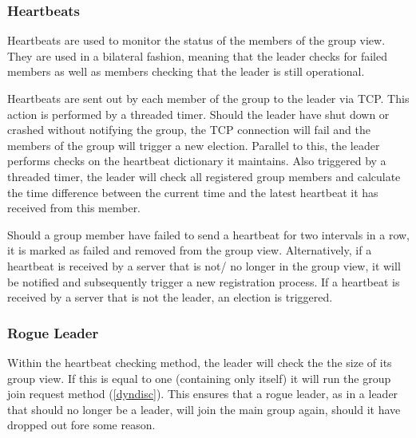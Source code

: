 \documentclass[runningheads]{llncs}
\begin{document}
\subsubsection{Heartbeats} \label{heartbeats}
Heartbeats are used to monitor the status of the members of the group view. They are used in a bilateral fashion, meaning that the leader checks for failed members as well as members checking that the leader is still operational.

Heartbeats are sent out by each member of the group to the leader via TCP. This action is performed by a threaded timer. Should the leader have shut down or crashed without notifying the group, the TCP connection will fail and the members of the group will trigger a new election. Parallel to this, the leader performs checks on the heartbeat dictionary it maintains. Also triggered by a threaded timer, the leader will check all registered group members and calculate the time difference between the current time and the latest heartbeat it has received from this member.

Should a group member have failed to send a heartbeat for two intervals in a row, it is marked as failed and removed from the group view. Alternatively, if a heartbeat is received by a server that is not/ no longer in the group view, it will be notified and subsequently trigger a new registration process. If a heartbeat is received by a server that is not the leader, an election is triggered.

\subsubsection{Rogue Leader} \label{rogueleader}
Within the heartbeat checking method, the leader will check the the size of its group view. If this is equal to one (containing only itself) it will run the group join request method (\ref{dyndisc}). This ensures that a rogue leader, as in a leader that should no longer be a leader, will join the main group again, should it have dropped out fore some reason.
\end{document}
